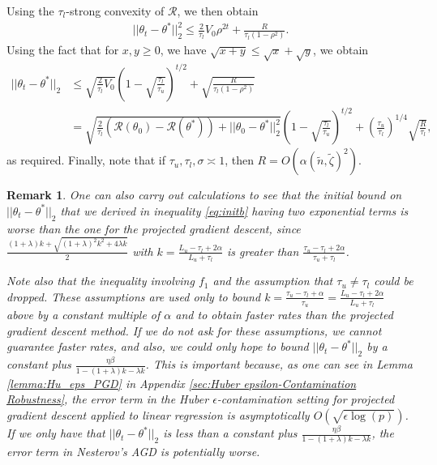 \documentclass{article}
\newtheorem{remark}{\textbf{Remark}}
\begin{document}
Using the $\tau_l$-strong convexity of $\mathcal{R}$, we then obtain
\begin{align*}
||\theta_t - \theta^*||_2^2 \leq \frac{2}{\tau_l}V_0\rho^{2t} + \frac{R}{\tau_l(1 - \rho^2)}.
\end{align*}
Using the fact that for $x, y \geq 0$, we have $\sqrt{x + y} \leq \sqrt{x} + \sqrt{y}$, we obtain
\begin{align*}
||\theta_t - \theta^*||_2 &\leq \sqrt{\frac{2}{\tau_l}V_0}\left(1 - \sqrt{\frac{\tau_l}{\tau_u}}\right)^{t/2} + \sqrt{\frac{R}{\tau_l(1 - \rho^2)}}\\ 
&= \sqrt{\frac{2}{\tau_l}\left(\mathcal{R}(\theta_0) - \mathcal{R}(\theta^*)\right) + ||\theta_0 - \theta^*||_2^2}\left(1 - \sqrt{\frac{\tau_l}{\tau_u}}\right)^{t/2} + \left(\frac{\tau_u}{\tau_l}\right)^{1/4}\sqrt{\frac{R}{\tau_l}},
\end{align*}
as required. Finally, note that if $\tau_u, \tau_l, \sigma \asymp 1$, then $R = O\left(\alpha(\widetilde{n}, \widetilde{\zeta})^2\right)$.

\begin{remark}
One can also carry out calculations to see that the initial bound on $||\theta_t - \theta^*||_2$ that we derived in inequality \eqref{eq:initb} having two exponential terms is worse than the one for the projected gradient descent, since $\frac{(1 + \lambda)k + \sqrt{(1 + \lambda)^2k^2 + 4\lambda k}}{2}$ with $k = \frac{L_u - \tau_l + 2\alpha}{L_u + \tau_l}$ is greater than $\frac{\tau_u - \tau_l + 2\alpha}{\tau_u + \tau_l}$. 

Note also that the inequality involving $f_1$ and the assumption that $\tau_u \neq \tau_l$ could be dropped. These assumptions are used only to bound $k = \frac{\tau_u - \tau_l + \alpha}{\tau_u} = \frac{L_u - \tau_l + 2\alpha}{L_u + \tau_l}$ above by a constant multiple of $\alpha$ and to obtain faster rates than the projected gradient descent method. If we do not ask for these assumptions, we cannot guarantee faster rates, and also, we could only hope to bound $||\theta_t - \theta^*||_2$ by a constant plus $\frac{\eta\beta}{1 - (1 + \lambda)k - \lambda k}$. This is important because, as one can see in Lemma \ref{lemma:Hu_eps_PGD} in Appendix \ref{sec:Huber epsilon-Contamination Robustness}, the error term in the Huber $\epsilon$-contamination setting for projected gradient descent applied to linear regression is asymptotically $O\left(\sqrt{\epsilon \log(p)}\right)$. If we only have that $||\theta_t - \theta^*||_2$ is less than a constant plus $\frac{\eta\beta}{1 - (1 + \lambda)k - \lambda k}$, the error term in Nesterov's AGD is potentially worse.
\end{remark}
\end{document}
